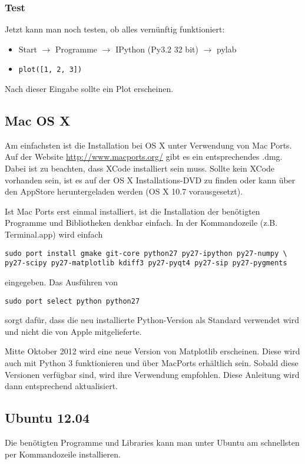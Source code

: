 \subsubsection{Test}
Jetzt kann man noch testen, ob alles vernünftig funktioniert:
\begin{itemize}
  \item Start $\rightarrow$ Programme $\rightarrow$ IPython (Py3.2 32 bit) $\rightarrow$ pylab
  \item \texttt{plot([1, 2, 3])}
\end{itemize}
Nach dieser Eingabe sollte ein Plot erscheinen.

\subsection{Mac OS X}
Am einfachsten ist die Installation bei OS X unter Verwendung von Mac Ports.
Auf der Website \url{http://www.macports.org/} gibt es ein entsprechendes .dmg.
Dabei ist zu beachten, dass XCode installiert sein muss. Sollte kein XCode vorhanden sein, ist es auf der OS X Installations-DVD zu finden oder kann über den AppStore heruntergeladen werden (OS X 10.7 vorausgesetzt).

Ist Mac Ports erst einmal installiert, ist die Installation der benötigten Programme und Bibliotheken denkbar einfach.
In der Kommandozeile (z.B. Terminal.app) wird einfach
\begin{verbatim}
sudo port install gmake git-core python27 py27-ipython py27-numpy \
py27-scipy py27-matplotlib kdiff3 py27-pyqt4 py27-sip py27-pygments
\end{verbatim}
eingegeben.
Das Ausführen von
\begin{verbatim}
sudo port select python python27
\end{verbatim}
sorgt dafür, dass die neu installierte Python-Version als Standard verwendet wird und nicht die von Apple mitgelieferte.

Mitte Oktober 2012 wird eine neue Version von Matplotlib erscheinen.
Diese wird auch mit Python 3 funktionieren und über MacPorts erhältlich sein.
Sobald diese Versionen verfügbar sind, wird ihre Verwendung empfohlen.
Diese Anleitung wird dann entsprechend aktualisiert.

\subsection{Ubuntu 12.04}
Die benötigten Programme und Libraries kann man unter Ubuntu am schnellsten per Kommandozeile installieren.

